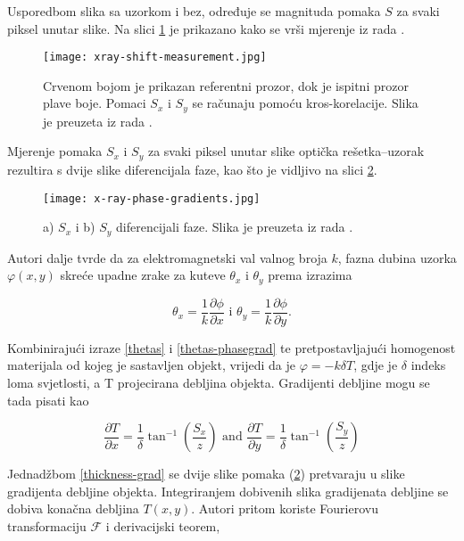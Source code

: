 \documentclass[times, utf8, diplomski, numeric]{fer}
\begin{document}
Usporedbom slika sa uzorkom i bez, određuje se magnituda pomaka $S$ za svaki piksel unutar slike. Na slici \ref{Morgan:11-xray-shift-measurement} je prikazano kako se vrši mjerenje iz rada \citep{Morgan:11}. 

\begin{figure}[h]
	\texttt{[image: xray-shift-measurement.jpg]}
	\centering
	\caption{Crvenom bojom je prikazan referentni prozor, dok je ispitni prozor plave boje. Pomaci $S_x$ i $S_y$ se računaju pomoću kros-korelacije. Slika je preuzeta iz rada \cite{Morgan:11}.}
	\label{Morgan:11-xray-shift-measurement}
\end{figure}

Mjerenje pomaka $S_x$ i $S_y$ za svaki piksel unutar slike optička rešetka--uzorak rezultira s dvije slike diferencijala faze, kao što je vidljivo na slici \ref{Morgan:11-xray-phase-gradients}. 

\begin{figure}[h]
	\texttt{[image: x-ray-phase-gradients.jpg]}
	\centering
	\caption{a) $S_x$ i b) $S_y$ diferencijali faze. Slika je preuzeta iz rada \cite{Morgan:11}.}
	\label{Morgan:11-xray-phase-gradients}
\end{figure}

Autori dalje tvrde da za elektromagnetski val valnog broja $k$, fazna dubina uzorka $\varphi(x,y)$ skreće upadne zrake za kuteve $\theta_x$ i $\theta_y$ prema izrazima

\begin{equation}
	\label{thetas-phasegrad}
	\theta_x = \frac{1}{k}\frac{\partial\phi}{\partial x} \text{ i } \theta_y = \frac{1}{k}\frac{\partial\phi}{\partial y}.
\end{equation}

Kombinirajući izraze \ref{thetas} i \ref{thetas-phasegrad} te pretpostavljajući homogenost materijala od kojeg je sastavljen objekt, vrijedi da je $\varphi = -k\delta T$, gdje je $\delta$ indeks loma svjetlosti, a T projecirana debljina objekta. Gradijenti debljine mogu se tada pisati kao

\begin{equation}
	\label{thickness-grad}
	\frac{\partial T}{\partial x} = \frac{1}{\delta}\tan^{-1}\left(\frac{S_x}{z}\right) \text{ and } \frac{\partial T}{\partial y} = \frac{1}{\delta}\tan^{-1}\left(\frac{S_y}{z}\right) 
\end{equation}

Jednadžbom \ref{thickness-grad} se dvije slike pomaka (\ref{Morgan:11-xray-phase-gradients}) pretvaraju u slike gradijenta debljine objekta. Integriranjem dobivenih slika gradijenata debljine se dobiva konačna debljina $T(x,y)$. Autori \cite{Morgan:11} pritom koriste Fourierovu transformaciju $\mathcal{F}$ i derivacijski teorem,
\end{document}
